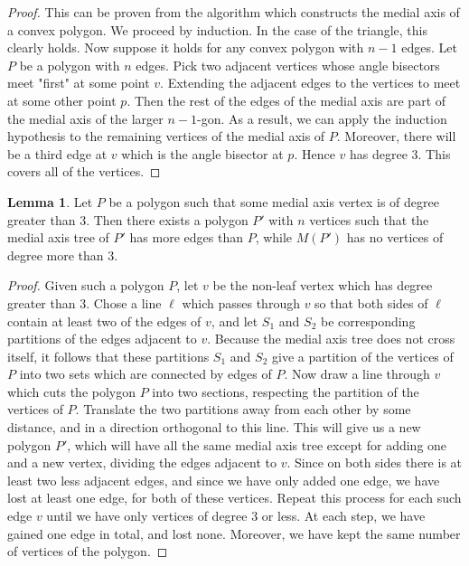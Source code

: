 \documentclass[12pt]{article}
\theoremstyle{definition}
\newtheorem{lemma}{Lemma}
\begin{document}
\begin{proof}
This can be proven from the algorithm which constructs the medial axis of a convex polygon. We proceed by induction. In the case of the triangle, this clearly holds. Now suppose it holds for any convex polygon with $n-1$ edges. Let $P$ be a polygon with $n$ edges. Pick two adjacent vertices whose angle bisectors meet "first" at some point $v$. Extending the adjacent edges to the vertices to meet at some other point $p$. Then the rest of the edges of the medial axis are part of the medial axis of the larger $n-1$-gon. As a result, we can apply the induction hypothesis to the remaining vertices of the medial axis of $P$. Moreover, there will be a third edge at $v$ which is the angle bisector at $p$. Hence $v$ has degree $3$. This covers all of the vertices. 
\end{proof}

\begin{lemma}
Let $P$ be a polygon such that some medial axis vertex is of degree greater than $3$. Then there exists a polygon $P'$ with $n$ vertices such that the medial axis tree of $P'$ has more edges than $P$, while $M(P')$ has no vertices of degree more than $3$.  
\end{lemma}


\begin{proof}
Given such a polygon $P$, let $v$ be the non-leaf vertex which has degree greater than $3$. Chose a line $\ell$ which passes through $v$ so that both sides of $\ell$ contain at least two of the edges of $v$, and let $S_1$ and $S_2$ be corresponding partitions of the edges adjacent to $v$. Because the medial axis tree does not cross itself, it follows that these partitions $S_1$ and $S_2$ give a partition of the vertices of $P$ into two sets which are connected by edges of $P$. Now draw a line through $v$ which cuts the polygon $P$ into two sections, respecting the partition of the vertices of $P$. Translate the two partitions away from each other by some distance, and in a direction orthogonal to this line. This will give us a new polygon $P'$, which will have all the same medial axis tree except for adding one and a new vertex, dividing the edges adjacent to $v$. Since on both sides there is at least two less adjacent edges, and since we have only added one edge, we have lost at least one edge, for both of these vertices. Repeat this process for each such edge $v$ until we have only vertices of degree $3$ or less. At each step, we have gained one edge in total, and lost none. Moreover, we have kept the same number of vertices of the polygon.
\end{proof}
\end{document}
